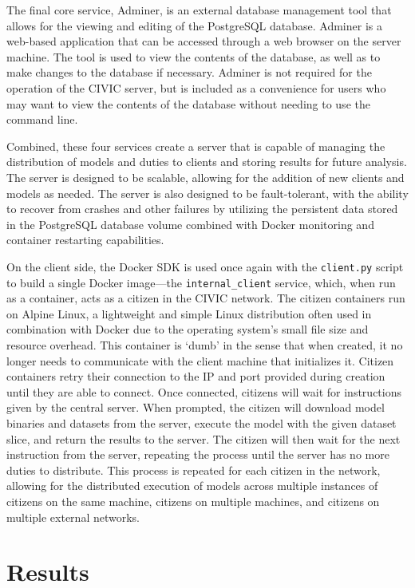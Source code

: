\documentclass[11pt]{article}
\begin{document}
The final core service, Adminer, is an external database management tool that allows for the viewing and editing of the PostgreSQL database. Adminer is a web-based application that can be accessed through a web browser on the server machine. The tool is used to view the contents of the database, as well as to make changes to the database if necessary. Adminer is not required for the operation of the CIVIC server, but is included as a convenience for users who may want to view the contents of the database without needing to use the command line.

Combined, these four services create a server that is capable of managing the distribution of models and duties to clients and storing results for future analysis. The server is designed to be scalable, allowing for the addition of new clients and models as needed. The server is also designed to be fault-tolerant, with the ability to recover from crashes and other failures by utilizing the persistent data stored in the PostgreSQL database volume combined with Docker monitoring and container restarting capabilities.

On the client side, the Docker SDK is used once again with the \verb|client.py| script to build a single Docker image---the \verb|internal_client| service, which, when run as a container, acts as a citizen in the CIVIC network. The citizen containers run on Alpine Linux, a lightweight and simple Linux distribution often used in combination with Docker due to the operating system's small file size and resource overhead. This container is `dumb' in the sense that when created, it no longer needs to communicate with the client machine that initializes it. Citizen containers retry their connection to the IP and port provided during creation until they are able to connect. Once connected, citizens will wait for instructions given by the central server. When prompted, the citizen will download model binaries and datasets from the server, execute the model with the given dataset slice, and return the results to the server. The citizen will then wait for the next instruction from the server, repeating the process until the server has no more duties to distribute. This process is repeated for each citizen in the network, allowing for the distributed execution of models across multiple instances of citizens on the same machine, citizens on multiple machines, and citizens on multiple external networks. 

\section{Results}
\end{document}

